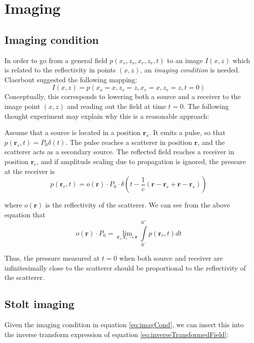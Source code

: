\documentclass{article}%
\begin{document}
\section{Imaging}
\subsection{Imaging condition}
In order to go from a general field $p(x_s,z_s,x_r,z_r,t)$ to an image $I(x,z)$ which is related to the reflectivity in points $(x,z)$, an \textit{imaging condition} is needed. Claerbout \cite{Claerbout1971} suggested the following mapping:
\begin{equation}
	I(x,z) = p(x_s = x, z_s = z, x_r = x, z_r = z, t=0)
\label{eq:imagCond}
\end{equation}
Conceptually, this corresponds to lowering both a source and a receiver to the image point $(x,z)$ and reading out the field at time $t=0$. The following thought experiment may explain why this is a reasonable approach:

Assume that a source is located in a position $\bm{r}_s$. It emits a pulse, so that $p(\bm{r}_s,t) = P_0 \delta(t)$. The pulse reaches a scatterer in position $\bm{r}$, and the scatterer acts as a secondary source. The reflected field reaches a receiver in position $\bm{r}_r$, and if amplitude scaling due to propagation is ignored, the pressure at the receiver is 
\begin{equation}
	p(\bm{r}_r,t) = o(\bm{r}) \cdot P_0 \cdot \delta \left(t - \frac{1}{c} \left(\bm{r}-\bm{r}_s + \bm{r} - \bm{r}_s \right) \right)
\label{eq:}
\end{equation}

where $o(\bm{r})$ is the reflectivity of the scatterer. We can see from the above equation that
\begin{equation}
	o(\bm{r}) \cdot P_0 = \lim_{\bm{r}_s,\bm{r}_r \rightarrow \bm{r}} \int\limits_{0^-}^{0^+}p(\bm{r}_r,t) dt
\label{eq:}
\end{equation}

Thus, the pressure measured at $t=0$ when both source and receiver are infinitesimally close to the scatterer should be proportional to the reflectivity of the scatterer.

\subsection{Stolt imaging}
Given the imaging condition in equation \ref{eq:imagCond}, we can insert this into the inverse transform expression of equation \ref{eq:inverseTransformedField}:
\end{document}
